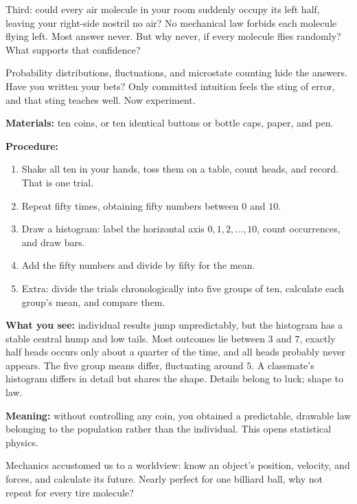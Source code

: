 Third: could every air molecule in your room suddenly occupy its left half, leaving your right-side nostril no air? No mechanical law forbids each molecule flying left. Most answer never. But why never, if every molecule flies randomly? What supports that confidence?

Probability distributions, fluctuations, and microstate counting hide the answers. Have you written your bets? Only committed intuition feels the sting of error, and that sting teaches well. Now experiment.


\begin{experiment}
\textbf{Materials:} ten coins, or ten identical buttons or bottle caps, paper, and pen.

\textbf{Procedure:}
\begin{enumerate}[itemsep=2pt]
  \item Shake all ten in your hands, toss them on a table, count heads, and record. That is one trial.
  \item Repeat fifty times, obtaining fifty numbers between \(0\) and \(10\).
  \item Draw a histogram: label the horizontal axis \(0,1,2,\dots,10\), count occurrences, and draw bars.
  \item Add the fifty numbers and divide by fifty for the mean.
  \item Extra: divide the trials chronologically into five groups of ten, calculate each group's mean, and compare them.
\end{enumerate}

\textbf{What you see:} individual results jump unpredictably, but the histogram has a stable central hump and low tails. Most outcomes lie between \(3\) and \(7\), exactly half heads occurs only about a quarter of the time, and all heads probably never appears. The five group means differ, fluctuating around \(5\). A classmate's histogram differs in detail but shares the shape. Details belong to luck; shape to law.

\textbf{Meaning:} without controlling any coin, you obtained a predictable, drawable law belonging to the population rather than the individual. This opens statistical physics.
\end{experiment}


Mechanics accustomed us to a worldview: know an object's position, velocity, and forces, and calculate its future. Nearly perfect for one billiard ball, why not repeat for every tire molecule?

